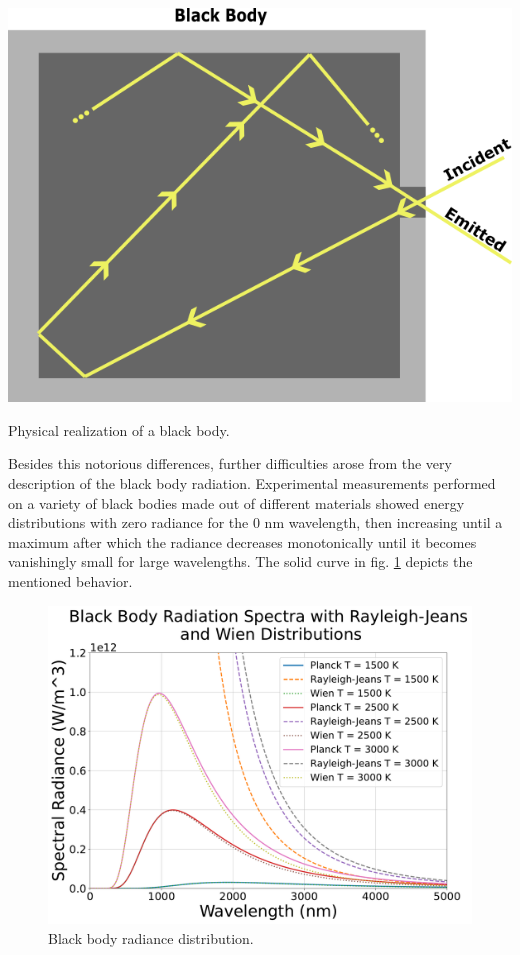\documentclass{article}
\begin{document}
\begin{marginfigure}%
  \includegraphics[width=\linewidth]{figures/blackbodyimg}
  \caption{Physical realization of a black body.}
  \label{fig:blackbodyimg}
\end{marginfigure}
Besides this notorious differences, further difficulties arose from the very description of the black body radiation. Experimental measurements performed on a variety of black bodies made out of different materials showed energy distributions with zero radiance for the 0 nm wavelength, then increasing until a maximum after which the radiance decreases monotonically until it becomes vanishingly small for large wavelengths. The solid curve in fig. \ref{fig:blackbodyrad} depicts the mentioned behavior.
\begin{figure}%
  \includegraphics[width=\linewidth]{figures/blackbody}
  \caption{Black body radiance distribution.}
  \label{fig:blackbodyrad}
\end{figure}
\end{document}
